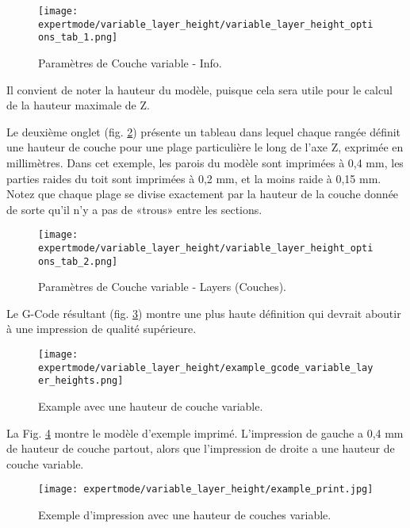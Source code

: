 \begin{figure}[H]
\centering
\texttt{[image: expertmode/variable\_layer\_height/variable\_layer\_height\_options\_tab\_1.png]}
\caption{Param\`etres de Couche variable - Info.}
\label{fig:variable_layer_height_options_tab_1}
\end{figure}

Il convient de noter la hauteur du mod\`ele, puisque cela sera utile pour le calcul de la hauteur maximale de Z.

Le deuxi\`eme onglet (fig. \ref{fig:variable_layer_height_options_tab_2}) pr\'esente un tableau dans lequel chaque rang\'ee d\'efinit une hauteur de couche pour une plage particuli\`ere le long de l'axe Z, exprim\'ee en millim\`etres. Dans cet exemple, les parois du mod\`ele sont imprim\'ees \`a 0,4 mm, les parties raides du toit sont imprim\'ees \`a 0,2 mm, et la moins raide \`a 0,15 mm. Notez que chaque plage se divise exactement par la hauteur de la couche donn\'ee de sorte qu'il n'y a pas de «trous» entre les sections.

\begin{figure}[H]
\centering
\texttt{[image: expertmode/variable\_layer\_height/variable\_layer\_height\_options\_tab\_2.png]}
\caption{Param\`etres de Couche variable - Layers (Couches).}
\label{fig:variable_layer_height_options_tab_2}
\end{figure}

Le G-Code r\'esultant (fig. \ref{fig:example_gcode_variable_layer_heights}) montre une plus haute d\'efinition qui devrait aboutir \`a une impression de qualit\'e sup\'erieure.

\begin{figure}[H]
\centering
\texttt{[image: expertmode/variable\_layer\_height/example\_gcode\_variable\_layer\_heights.png]}
\caption{Example avec une hauteur de couche variable.}
\label{fig:example_gcode_variable_layer_heights}
\end{figure}

La Fig. \ref{fig:example_print} montre le mod\`ele d'exemple imprim\'e.  L'impression de gauche a 0,4 mm  de hauteur de couche partout, alors que l'impression de droite a une hauteur de couche variable.

\begin{figure}[H]
\centering
\texttt{[image: expertmode/variable\_layer\_height/example\_print.jpg]}
\caption{Exemple d'impression avec une hauteur de couches variable.}
\label{fig:example_print}
\end{figure}

